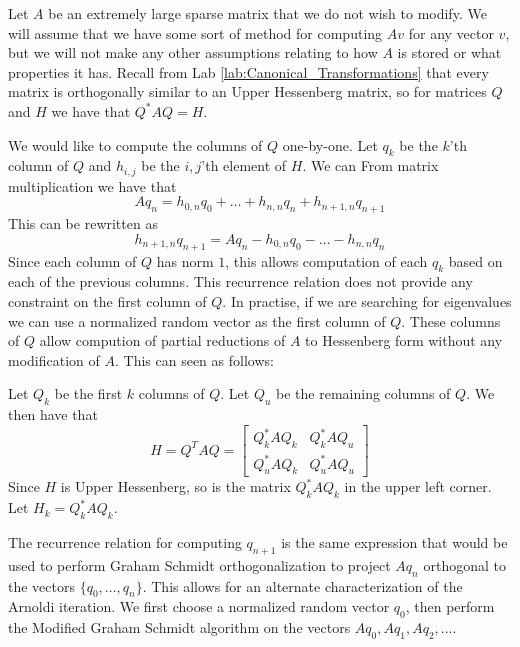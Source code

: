 Let $A$ be an extremely large sparse matrix that we do not wish to modify.
We will assume that we have some sort of method for computing $A v$ for any vector $v$, but we will not make any other assumptions relating to how $A$ is stored or what properties it has.
Recall from Lab \ref{lab:Canonical_Transformations} that every matrix is orthogonally similar to an Upper Hessenberg matrix, so for matrices $Q$ and $H$ we have that $Q^* A Q = H$.

We would like to compute the columns of $Q$ one-by-one.
Let $q_k$ be the $k$'th column of $Q$ and $h_{i,j}$ be the $i,j$'th element of $H$.
We can 
From matrix multiplication we have that 
\[A q_n = h_{0, n} q_0 + \dots + h_{n, n} q_n + h_{n+1, n} q_{n+1}\]
This can be rewritten as
\[h_{n+1, n} q_{n+1} = A q_n - h_{0,n} q_0 - \dots - h_{n,n} q_n\]
Since each column of $Q$ has norm $1$, this allows computation of each $q_k$ based on each of the previous columns.
This recurrence relation does not provide any constraint on the first column of $Q$.
In practise, if we are searching for eigenvalues we can use a normalized random vector as the first column of $Q$.
These columns of $Q$ allow compution of partial reductions of $A$ to Hessenberg form without any modification of $A$.
This can seen as follows:

Let $Q_k$ be the first $k$ columns of $Q$.
Let $Q_u$ be the remaining columns of $Q$.
We then have that
\[H = Q^T A Q =
\begin{bmatrix}
Q_k^* A Q_k & Q_k^* A Q_u \\
Q_u^* A Q_k & Q_u^* A Q_u
\end{bmatrix}\]
Since $H$ is Upper Hessenberg, so is the matrix $Q_k^* A Q_k$ in the upper left corner.
Let $H_k = Q_k^* A Q_k$.

The recurrence relation for computing $q_{n+1}$ is the same expression that would be used to perform Graham Schmidt orthogonalization to project $A q_n$ orthogonal to the vectors $\lbrace q_0, \dots, q_n \rbrace$.
This allows for an alternate characterization of the Arnoldi iteration.
We first choose a normalized random vector $q_0$, then perform the Modified Graham Schmidt algorithm on the vectors $A q_0, A q_1, A q_2, \dots$.

